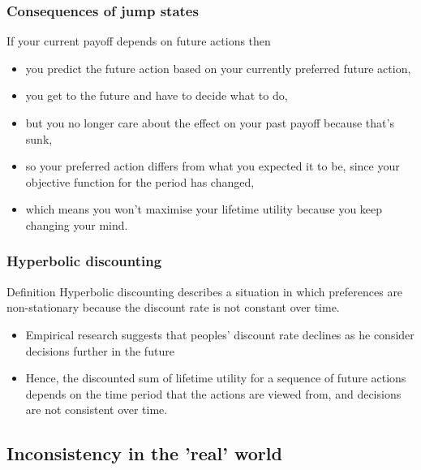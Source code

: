 \documentclass{beamer}
\begin{document}
\begin{frame}
  \frametitle{Consequences of jump states}
If your current payoff depends on future actions then
  \begin{itemize}
  \item<1-> you predict the future action based on your currently
    preferred future action,
  \item<2-> you get to the future and have to decide what to do,
  \item<3-> but you no longer care about the effect on your past
    payoff because that's sunk,
  \item<4-> so your preferred action differs from what you expected it
    to be, since your objective function for the period has changed,
  \item<5-> which means you won't maximise your lifetime utility
    because you keep changing your mind.
  \end{itemize}
\end{frame}

\begin{frame}
  \frametitle{Hyperbolic discounting}
  \begin{block}{Definition}
    Hyperbolic discounting describes a situation in which preferences
    are non-stationary because the discount rate is not constant over
    time.
  \end{block}
  \begin{itemize}
  \item<1-> Empirical research suggests that peoples' discount rate
    declines as he consider decisions further in the future
  \item<2-> Hence, the discounted sum of lifetime utility for a
    sequence of future actions depends on the time period that the
    actions are viewed from, and decisions are not consistent over
    time.
  \end{itemize}
\end{frame}

\subsection{Inconsistency in the 'real' world}
\end{document}

